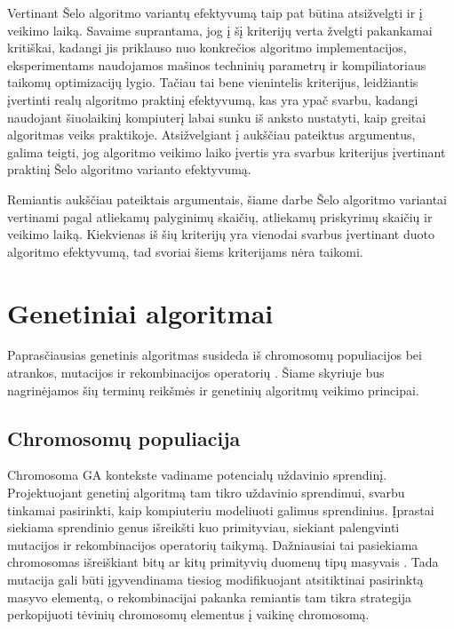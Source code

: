 \documentclass{VUMIFInfBakalaurinis}
\begin{document}

Vertinant Šelo algoritmo variantų efektyvumą taip pat būtina atsižvelgti ir į veikimo laiką.
Savaime suprantama, jog į šį kriterijų verta žvelgti pakankamai kritiškai, kadangi jis priklauso nuo konkrečios algoritmo implementacijos,
eksperimentams naudojamos mašinos techninių parametrų ir kompiliatoriaus taikomų optimizacijų lygio.
Tačiau tai bene vienintelis kriterijus, leidžiantis įvertinti realų algoritmo praktinį efektyvumą, kas yra ypač svarbu,
kadangi naudojant šiuolaikinį kompiuterį labai sunku iš anksto nustatyti, kaip greitai algoritmas veiks praktikoje.
Atsižvelgiant į aukščiau pateiktus argumentus, galima teigti, jog
algoritmo veikimo laiko įvertis yra svarbus kriterijus įvertinant praktinį Šelo algoritmo varianto efektyvumą.

Remiantis aukščiau pateiktais argumentais, šiame darbe Šelo algoritmo variantai vertinami pagal
atliekamų palyginimų skaičių, atliekamų priskyrimų skaičių ir veikimo laiką.
Kiekvienas iš šių kriterijų yra vienodai svarbus įvertinant duoto algoritmo efektyvumą, tad svoriai šiems kriterijams nėra taikomi.

\section{Genetiniai algoritmai}

Paprasčiausias genetinis algoritmas susideda iš chromosomų populiacijos bei atrankos, mutacijos ir rekombinacijos operatorių \cite{simpson1999faster}.
Šiame skyriuje bus nagrinėjamos šių terminų reikšmės ir genetinių algoritmų veikimo principai.

\subsection{Chromosomų populiacija}

Chromosoma GA kontekste vadiname potencialų uždavinio sprendinį.
Projektuojant genetinį algoritmą tam tikro uždavinio sprendimui, svarbu tinkamai pasirinkti,
kaip kompiuteriu modeliuoti galimus sprendinius.
Įprastai siekiama sprendinio genus išreikšti kuo primityviau, siekiant
palengvinti mutacijos ir rekombinacijos operatorių taikymą.
Dažniausiai tai pasiekiama chromosomas išreiškiant bitų ar kitų primityvių duomenų tipų masyvais \cite{whitley1994genetic}.
Tada mutacija gali būti įgyvendinama tiesiog modifikuojant atsitiktinai pasirinktą masyvo elementą,
o rekombinacijai pakanka remiantis tam tikra strategija perkopijuoti tėvinių chromosomų elementus į vaikinę chromosomą.
\end{document}
